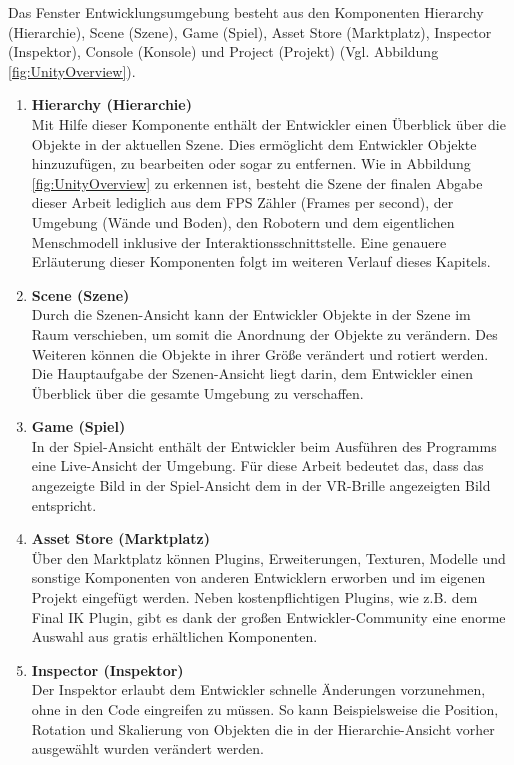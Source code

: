 \newpage
\noindent Das Fenster Entwicklungsumgebung besteht aus den Komponenten Hierarchy (Hierarchie), Scene (Szene), Game (Spiel), Asset Store (Marktplatz), Inspector (Inspektor), Console (Konsole) und Project (Projekt) (Vgl. Abbildung \ref{fig:UnityOverview}).
\begin{enumerate}
	\item \textbf{Hierarchy (Hierarchie)} \\
	Mit Hilfe dieser Komponente enthält der Entwickler einen Überblick über die Objekte in der aktuellen Szene. Dies ermöglicht dem Entwickler Objekte hinzuzufügen, zu bearbeiten oder sogar zu entfernen. Wie in Abbildung \ref{fig:UnityOverview} zu erkennen ist, besteht die Szene der finalen Abgabe dieser Arbeit lediglich aus dem FPS Zähler (Frames per second), der Umgebung (Wände und Boden), den Robotern und dem eigentlichen Menschmodell inklusive der Interaktionsschnittstelle. Eine genauere Erläuterung dieser Komponenten folgt im weiteren Verlauf dieses Kapitels.
	\item \textbf{Scene (Szene)} \\
	Durch die Szenen-Ansicht kann der Entwickler Objekte in der Szene im Raum verschieben, um somit die Anordnung der Objekte zu verändern. Des Weiteren können die Objekte in ihrer Größe verändert und rotiert werden. Die Hauptaufgabe der Szenen-Ansicht liegt darin, dem Entwickler einen Überblick über die gesamte Umgebung zu verschaffen.
	\item \textbf{Game (Spiel)} \\
	In der Spiel-Ansicht enthält der Entwickler beim Ausführen des Programms eine Live-Ansicht der Umgebung. Für diese Arbeit bedeutet das, dass das angezeigte Bild in der Spiel-Ansicht dem in der VR-Brille angezeigten Bild entspricht.
	\item \textbf{Asset Store (Marktplatz)} \\
	Über den Marktplatz können Plugins, Erweiterungen, Texturen, Modelle und sonstige Komponenten von anderen Entwicklern erworben und im eigenen Projekt eingefügt werden. Neben kostenpflichtigen Plugins, wie z.B. dem Final IK Plugin, gibt es dank der großen Entwickler-Community eine enorme Auswahl aus gratis erhältlichen Komponenten.
	\item \textbf{Inspector (Inspektor)} \\
	Der Inspektor erlaubt dem Entwickler schnelle Änderungen vorzunehmen, ohne in den Code eingreifen zu müssen. So kann Beispielsweise die Position, Rotation und Skalierung von Objekten die in der Hierarchie-Ansicht vorher ausgewählt wurden verändert werden.

\end{enumerate}
